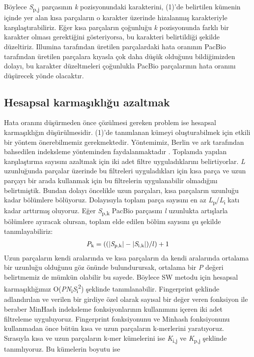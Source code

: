 Böylece \textit{S}\textsubscript{p,j} parçasının \textit{k} pozisyonundaki karakterini, (1)'de belirtilen kümenin içinde yer alan kısa parçaların o karakter üzerinde hizalanmış karakteriyle karşılaştırabiliriz. Eğer kısa parçaların çoğunluğu \textit{k} pozisyonunda farklı bir karakter olması gerektiğini gösteriyorsa, bu karakteri belirtildiği şekilde düzeltiriz. Illumina tarafından üretilen parçalardaki hata oranının PacBio tarafından üretilen parçalara kıyasla çok daha düşük olduğunu bildiğimizden dolayı, bu karakter düzeltmeleri çoğunlukla PacBio parçalarının hata oranını düşürecek yönde olacaktır.

\subsection{Hesapsal karmaşıklığu azaltmak}
Hata oranını düşürmeden önce çözülmesi gereken problem ise hesapsal karmaşıklığın düşürülmesidir. (1)'de tanımlanan kümeyi oluşturabilmek için etkili bir yöntem önerebilmemiz gerekmektedir. Yöntemimiz, Berlin ve ark tarafından bahsedilen indeksleme yönteminden faydalanmaktadır \cite{Berlin2015}. Toplamda yapılan karşılaştırma sayısını azaltmak için iki adet filtre uyguladıklarını belirtiyorlar. \textit{L} uzunluğunda parçalar üzerinde bu filtreleri uyguladıkları için kısa parça ve uzun parçayı bir arada kullanmak için bu filtrelerin uygulanabilir olmadığını belirtmiştik. Bundan dolayı öncelikle uzun parçaları, kısa parçaların uzunluğu kadar bölümlere bölüyoruz. Dolayısıyla toplam parça sayısını en az \textit{L}\textsubscript{p}/\textit{L}\textsubscript{i} katı kadar arttırmış oluyoruz. Eğer \textit{S}\textsubscript{p,k} PacBio parçasını \textit{l} uzunlukta artışlarla bölümlere ayıracak olursan, toplam elde edilen bölüm sayısını şu şekilde tanımlayabiliriz:
\begin{gather*}
\textit{P}\textsubscript{k} = ((|\textit{S}\textsubscript{p,k}| - |\textit{S}\textsubscript{i,k}| )/l) + 1
\end{gather*}
Uzun parçaların kendi aralarında ve kısa parçaların da kendi aralarında ortalama bir uzunluğu olduğunu göz önünde bulundurursak, ortalama bir \textit{P} değeri belirtmemiz de mümkün olabilir bu sayede. Böylece SW metodu için hesapsal karmaşıklığımız O(\textit{P}\textit{N}\textsubscript{i}\textbar\textit{S}\textsubscript{i}\textbar\textsuperscript{2}) şeklinde tanımlanabilir. Fingerprint şeklinde adlandırılan ve verilen bir girdiye özel olarak sayısal bir değer veren fonksiyon ile beraber MinHash indeksleme fonksiyonlarının kullanımını içeren iki adet filtreleme uyguluyoruz. Fingerprint fonksiyonunu ve Minhash fonksiyonunu kullanmadan önce bütün kısa ve uzun parçaların k-merlerini yaratıyoruz. Sırasıyla kısa ve uzun parçaların k-mer kümelerini ise \textit{K}\textsubscript{i,j} ve \textit{K}\textsubscript{p,j} şeklinde tanımlıyoruz. Bu kümelerin boyutu ise
